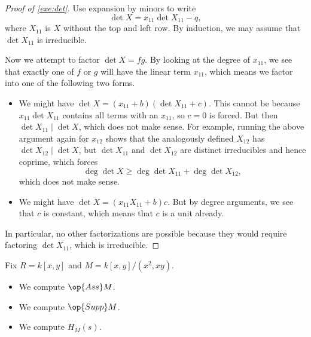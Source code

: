 \begin{proof}[Proof of \autoref{exe:det}]
	Use expansion by minors to write
	\[\det X=x_{11}\det X_{11}-q,\]
	where $X_{11}$ is $X$ without the top and left row. By induction, we may assume that $\det X_{11}$ is irreducible.
	
	Now we attempt to factor $\det X=fg$. By looking at the degree of $x_{11}$, we see that exactly one of $f$ or $g$ will have the linear term $x_{11}$, which means we factor into one of the following two forms.
	\begin{itemize}
		\item We might have $\det X=(x_{11}+b)(\det X_{11}+c)$. This cannot be because $x_{11}\det X_{11}$ contains all terms with an $x_{11}$, so $c=0$ is forced. But then $\det X_{11}\mid\det X$, which does not make sense. For example, running the above argument again for $x_{12}$ shows that the analogously defined $X_{12}$ has $\det X_{12}\mid\det X$, but $\det X_{11}$ and $\det X_{12}$ are distinct irreducibles and hence coprime, which forces
		\[\deg\det X\ge\deg\det X_{11}+\deg\det X_{12},\]
		which does not make sense.
		\item We might have $\det X=(x_{11}X_{11}+b)c$. But by degree arguments, we see that $c$ is constant, which means that $c$ is a unit already.
	\end{itemize}
	In particular, no other factorizations are possible because they would require factoring $\det X_{11}$, which is irreducible.
\end{proof}
\begin{exe}
	Fix $R=k[x,y]$ and $M=k[x,y]/\left(x^2,xy\right)$.
	\begin{itemize}
		\item We compute $\op{Ass}M$.
		\item We compute $\op{Supp}M$.
		\item We compute $H_M(s)$.
	\end{itemize}
\end{exe}
